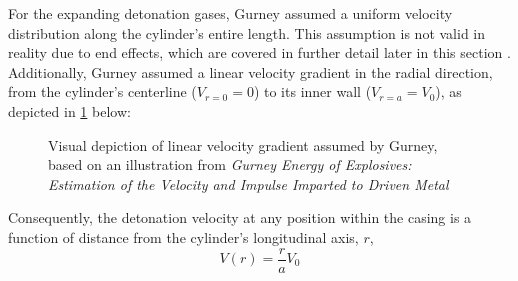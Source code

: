 For the expanding detonation gases, Gurney assumed a uniform velocity distribution along the cylinder's entire length. This assumption is not valid in reality due to end effects, which are covered in further detail later in this section \cite{GurneyOriginal}. Additionally, Gurney assumed a linear velocity gradient in the radial direction, from the cylinder's centerline ($V_{r=0} = 0$) to its inner wall ($V_{r=a} = V_0$), as depicted in \cref{fig:2_Cylinder_V_r} below: 
\begin{figure}[H]
	\centering
    \caption{Visual depiction of linear velocity gradient assumed by Gurney, 	based on an illustration from \textit{Gurney Energy of Explosives: Estimation of the Velocity and Impulse Imparted to Driven Metal} \cite{GurneyKennedy1970}}
	\label{fig:2_Cylinder_V_r}
\end{figure}
%
Consequently, the detonation velocity at any position within the casing is a function of distance from the cylinder's longitudinal axis, $r$,
%
\begin{equation}
V(r) = \frac{r}{a}V_0
\label{eq:2_linearvelocity}
\end{equation}
%


